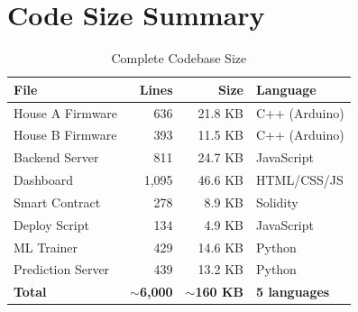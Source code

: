 \section{Code Size Summary}

\begin{table}[H]
\centering
\begin{tabular}{l r r l}
\toprule
\textbf{File} & \textbf{Lines} & \textbf{Size} & \textbf{Language} \\
\midrule
House A Firmware & 636 & 21.8 KB & C++ (Arduino) \\
House B Firmware & 393 & 11.5 KB & C++ (Arduino) \\
Backend Server & 811 & 24.7 KB & JavaScript \\
Dashboard & 1,095 & 46.6 KB & HTML/CSS/JS \\
Smart Contract & 278 & 8.9 KB & Solidity \\
Deploy Script & 134 & 4.9 KB & JavaScript \\
ML Trainer & 429 & 14.6 KB & Python \\
Prediction Server & 439 & 13.2 KB & Python \\
\midrule
\textbf{Total} & \textbf{$\sim$6,000} & \textbf{$\sim$160 KB} & \textbf{5 languages} \\
\bottomrule
\end{tabular}
\caption{Complete Codebase Size}
\end{table}
